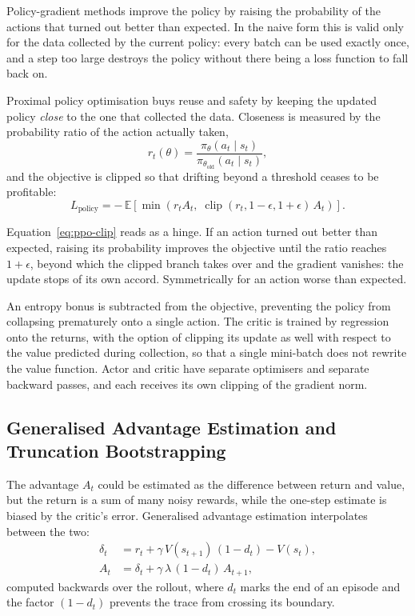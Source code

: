 Policy-gradient methods improve the policy by raising the probability of the
actions that turned out better than expected. In the naive form this is valid
only for the data collected by the current policy: every batch can be used
exactly once, and a step too large destroys the policy without there being a
loss function to fall back on.

Proximal policy optimisation \cite{schulman2017ppo} buys reuse and safety by
keeping the updated policy \emph{close} to the one that collected the data.
Closeness is measured by the probability ratio of the action actually taken,
\begin{equation}
  r_t(\theta) = \frac{\pi_\theta(a_t \mid s_t)}{\pi_{\theta_{\text{old}}}(a_t \mid s_t)},
  \label{eq:ppo-ratio}
\end{equation}
and the objective is clipped so that drifting beyond a threshold ceases to be
profitable:
\begin{equation}
  L_{\text{policy}} = -\,\mathbb{E}\!\left[\min\!\left(r_t A_t,\;
     \operatorname{clip}(r_t, 1-\epsilon, 1+\epsilon)\, A_t\right)\right].
  \label{eq:ppo-clip}
\end{equation}

Equation~\eqref{eq:ppo-clip} reads as a hinge. If an action turned out better
than expected, raising its probability improves the objective until the ratio
reaches $1+\epsilon$, beyond which the clipped branch takes over and the
gradient vanishes: the update stops of its own accord. Symmetrically for an
action worse than expected.

An entropy bonus is subtracted from the objective, preventing the policy from
collapsing prematurely onto a single action. The critic is trained by regression
onto the returns, with the option of clipping its update as well with respect to
the value predicted during collection, so that a single mini-batch does not
rewrite the value function. Actor and critic have separate optimisers and
separate backward passes, and each receives its own clipping of the gradient
norm.

\subsection{Generalised Advantage Estimation and Truncation Bootstrapping}
\label{sec:rl-gae}

The advantage $A_t$ could be estimated as the difference between return and
value, but the return is a sum of many noisy rewards, while the one-step
estimate is biased by the critic's error. Generalised advantage estimation
\cite{schulman2016gae} interpolates between the two:
\begin{align}
  \delta_t &= r_t + \gamma\, V(s_{t+1})\,(1 - d_t) - V(s_t), \\
  A_t      &= \delta_t + \gamma\,\lambda\,(1 - d_t)\, A_{t+1},
  \label{eq:gae}
\end{align}
computed backwards over the rollout, where $d_t$ marks the end of an episode and
the factor $(1-d_t)$ prevents the trace from crossing its boundary.

